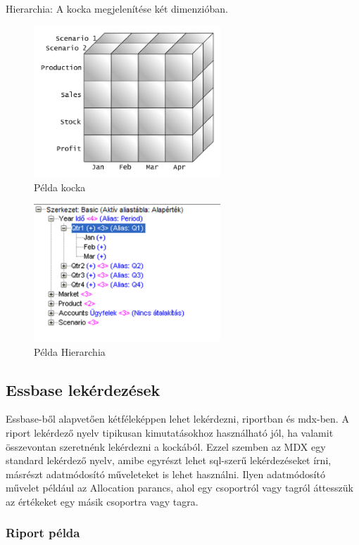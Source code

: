 Hierarchia: A kocka megjelenítése két dimenzióban.

\pagebreak

 \begin{figure}[!ht]
\centering
\includegraphics[width=70mm, keepaspectratio]{figures/cube1.png}
\caption{Példa kocka} 
\label{fig:Cube1}
\end{figure}

 \begin{figure}[!ht]
\centering
\includegraphics[width=70mm, keepaspectratio]{figures/hierarchy.png}
\caption{Példa Hierarchia} 
\label{fig:Cube1}
\end{figure}


\subsection{Essbase lekérdezések}

Essbase-ből alapvetően kétféleképpen lehet lekérdezni, riportban és mdx-ben. A riport lekérdező nyelv tipikusan kimutatásokhoz használható jól, ha valamit összevontan szeretnénk lekérdezni a kockából. Ezzel szemben az MDX egy standard lekérdező nyelv, amibe egyrészt lehet sql-szerű lekérdezéseket írni, másrészt adatmódosító műveleteket is lehet használni. Ilyen adatmódosító művelet például az Allocation parancs, ahol egy csoportról vagy tagról áttesszük az értékeket egy másik csoportra vagy tagra.

\subsubsection{Riport példa}

